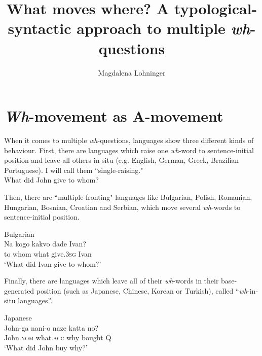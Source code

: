 \documentclass[output=paper,colorlinks,citecolor=brown]{langscibook}
\author{Magdalena Lohninger\affiliation{University of Vienna}}
\title[What moves where?]
      {What moves where? A typological-syntactic approach to multiple \textit{wh}-questions}
\begin{document}
\maketitle

\section{\textit{Wh}-movement as A-movement}
When it comes to multiple \textit{wh}-questions, languages show three different kinds of behaviour. First, there are languages which raise one \textit{wh}-word to sentence-initial position and leave all others in-situ (e.g. English, German, Greek, Brazilian Portuguese). I will call them “single-raising."
 \citep[351]{bovskovic2002multiple}\\
What did John give to whom?
\z

\noindent Then, there are ``multiple-fronting" languages like Bulgarian, Polish, Romanian, Hungarian, Bosnian, Croatian and Serbian,  which move several \textit{wh}-words to sentence-initial position.

\ea Bulgarian \citep[351]{bovskovic2002multiple}\\
\gll Na kogo kakvo dade Ivan?\\
to whom what give.\textsc{3sg} Ivan\\ 
\glt `What did Ivan give to whom?'
\z

\noindent Finally, there are languages which leave all of their \textit{wh}-words in their base-gen\-er\-at\-ed position (such as Japanese, Chinese, Korean or Turkish), called “\textit{wh}-in-situ languages”.

\ea Japanese \citep[31]{richards1997}\\
\gll John-ga nani-o naze katta no?\\
John.\textsc{nom} what.\textsc{acc} why bought \textsc{Q}\\ 
\glt `What did John buy why?'
\z
\end{document}
